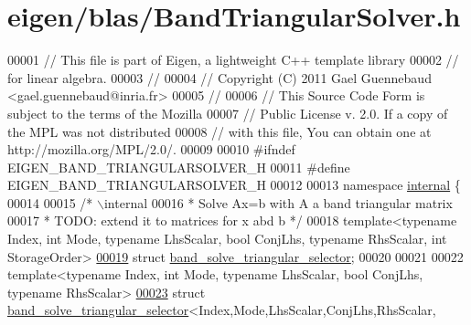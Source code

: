 \hypertarget{eigen_2blas_2_band_triangular_solver_8h_source}{}\section{eigen/blas/\+Band\+Triangular\+Solver.h}
\label{eigen_2blas_2_band_triangular_solver_8h_source}

\begin{DoxyCode}
00001 \textcolor{comment}{// This file is part of Eigen, a lightweight C++ template library}
00002 \textcolor{comment}{// for linear algebra.}
00003 \textcolor{comment}{//}
00004 \textcolor{comment}{// Copyright (C) 2011 Gael Guennebaud <gael.guennebaud@inria.fr>}
00005 \textcolor{comment}{//}
00006 \textcolor{comment}{// This Source Code Form is subject to the terms of the Mozilla}
00007 \textcolor{comment}{// Public License v. 2.0. If a copy of the MPL was not distributed}
00008 \textcolor{comment}{// with this file, You can obtain one at http://mozilla.org/MPL/2.0/.}
00009 
00010 \textcolor{preprocessor}{#ifndef EIGEN\_BAND\_TRIANGULARSOLVER\_H}
00011 \textcolor{preprocessor}{#define EIGEN\_BAND\_TRIANGULARSOLVER\_H}
00012 
00013 \textcolor{keyword}{namespace }\hyperlink{namespaceinternal}{internal} \{
00014 
00015  \textcolor{comment}{/* \(\backslash\)internal}
00016 \textcolor{comment}{  * Solve Ax=b with A a band triangular matrix}
00017 \textcolor{comment}{  * TODO: extend it to matrices for x abd b */}
00018 \textcolor{keyword}{template}<\textcolor{keyword}{typename} Index, \textcolor{keywordtype}{int} Mode, \textcolor{keyword}{typename} LhsScalar, \textcolor{keywordtype}{bool} ConjLhs, \textcolor{keyword}{typename} RhsScalar, \textcolor{keywordtype}{int} StorageOrder>
\hyperlink{structinternal_1_1band__solve__triangular__selector}{00019} \textcolor{keyword}{struct }\hyperlink{structinternal_1_1band__solve__triangular__selector}{band\_solve\_triangular\_selector};
00020 
00021 
00022 \textcolor{keyword}{template}<\textcolor{keyword}{typename} Index, \textcolor{keywordtype}{int} Mode, \textcolor{keyword}{typename} LhsScalar, \textcolor{keywordtype}{bool} ConjLhs, \textcolor{keyword}{typename} RhsScalar>
\hyperlink{structinternal_1_1band__solve__triangular__selector_3_01_index_00_01_mode_00_01_lhs_scalar_00_0193d039d924d700ecb916fd425a10f1bb}{00023} \textcolor{keyword}{struct }\hyperlink{structinternal_1_1band__solve__triangular__selector}{band\_solve\_triangular\_selector}<Index,Mode,LhsScalar,ConjLhs,RhsScalar,

\end{DoxyCode}
